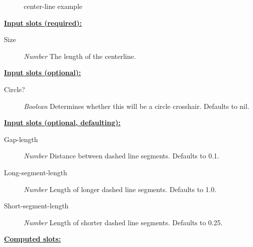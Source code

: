 \documentclass [11pt]{book}
\begin{document}
\begin{itemize}
\begin{figure}
\caption{center-line example}

\label{fig:center-line}

\end{figure}





\textbf{
\underline{Input slots (required):}}

\begin{description}

\item [Size]
\emph{Number} The length of the centerline.


\end{description}






\textbf{
\underline{Input slots (optional):}}

\begin{description}

\item [Circle?]
\emph{Boolean} Determines whether this will be a circle crosshair. Defaults to nil.


\end{description}






\textbf{
\underline{Input slots (optional, defaulting):}}

\begin{description}

\item [Gap-length]
\emph{Number} Distance between dashed line segments. Defaults to 0.1.


\item [Long-segment-length]
\emph{Number} Length of longer dashed line segments. Defaults to 1.0.


\item [Short-segment-length]
\emph{Number} Length of shorter dashed line segments. Defaults to 0.25.


\end{description}






\textbf{
\underline{Computed slots:}}

\begin{description}


\end{description}
\end{itemize}
\end{document}
